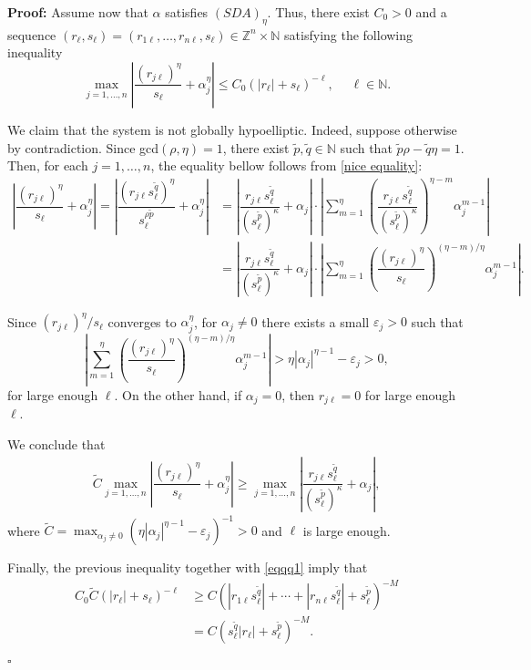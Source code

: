\documentclass[12pt]{elsarticle}
\numberwithin{equation}{section}
\newenvironment{proof}[1][\noindent \textbf{Proof: }]{#1}{ \hfill $\square$ \vspace{2mm}}
\begin{document}
\begin{proof}
	Assume now that $\alpha$ satisfies  $(SDA)_\eta$. Thus, there exist $C_0>0$ and a sequence $(r_\ell,s_\ell)=(r_{1\ell},\ldots,r_{n\ell},s_\ell)\in\mathbb{Z}^n\times\mathbb{N}$ satisfying the following inequality
	$$
	\max_{j=1,\ldots, n}	\left|\dfrac{(r_{j\ell})^ {\eta}}{s_\ell}+\alpha_j^{\eta}\right|\leq C_0 (|r_\ell|+s_\ell)^{-\ell},\quad \; \ell\in\mathbb{N}.
	$$		
	
	We claim that the system is not  globally hypoelliptic. Indeed, suppose otherwise by contradiction. 
	Since gcd$(\rho,\eta)=1$, there exist $\widetilde{p}, \widetilde{q}\in\mathbb{N}$ such that $\widetilde{p}\rho-\widetilde{q}\eta=1$. Then, for each $j=1,\ldots,n$, the equality bellow follows from  \eqref{nice equality}:
	\begin{align*}
	\left|\dfrac{(r_{j\ell})^{\eta}}{s_\ell}+\alpha_j^{\eta}\right | = \left|\dfrac{(r_{j\ell} s_{\ell}^{\widetilde{q}})^{\eta}}{s_\ell^{\rho\widetilde{p}}}+\alpha_j^{\eta}\right|  
	&= \left|\dfrac{r_{j\ell} s_{\ell}^{\widetilde{q}}}{(s_{\ell}^{\widetilde{p}})^{\kappa}}+\alpha_j\right| \cdot  \left|\sum_{m=1}^{\eta} \left(\dfrac{r_{j\ell} s_{\ell}^{\widetilde{q}}}{(s_{\ell}^{\widetilde{p}})^{\kappa}}\right)^{\eta-m}\alpha_j^{m-1}\right| \\
	& = \left|\dfrac{r_{j\ell} s_{\ell}^{\widetilde{q}}}{(s_{\ell}^{\widetilde{p}})^{\kappa}}+\alpha_j\right| \cdot  \left|\sum_{m=1}^{\eta} \left(\dfrac{(r_{j\ell})^{\eta} }{s_{\ell}}\right)^{({\eta-m})/\eta}\alpha_j^{m-1}\right|. 
	\end{align*}
	
	Since $(r_{j\ell})^{\eta}/{s_\ell}$ converges to $\alpha_j^\eta$, for $\alpha_{j}\neq 0$ there exists a small $\varepsilon_j>0$ such that 
	$$
	\left|\sum_{m=1}^{\eta} \left(\dfrac{(r_{j\ell})^{\eta} }{s_{\ell}}\right)^{({\eta-m})/\eta}\alpha_j^{m-1}\right|>\eta|\alpha_j|^{\eta-1}- \varepsilon_j >0,
	$$ 
	for large enough $\ell$. On the other hand, if $\alpha_{j}=0$, then $r_{j\ell}=0$ for large enough $\ell$.
	
	We conclude that 
	\begin{align*}
	\widetilde{C} \max_{j=1,\ldots, n}\left|\dfrac{(r_{j\ell}) ^{\eta}}{s_\ell}+\alpha_j^{\eta}\right | 
	\geq \max_{j=1,\ldots, n}\left|\dfrac{r_{j\ell} s_{\ell}^{\widetilde{q}}}{(s_{\ell}^{\widetilde{p}})^{\kappa}}+\alpha_j\right|,
	\end{align*}
	where  $\widetilde{C}=\max_{\alpha_{j}\neq 0}\left(\eta|\alpha_j|^{\eta-1}-\varepsilon_j\right)^{-1}>0$ and $\ell$ is large enough.  
	
	Finally, the previous inequality together with  \eqref{eqqq1} imply that  
	\begin{align*}
	{C_0\widetilde{C}}(|r_\ell|+s_\ell)^{-\ell}&\geq C (|r_{1\ell} s_{\ell}^{\widetilde{q}}|+\cdots+ |r_{n\ell} s_{\ell}^{\widetilde{q}}|+ s_{\ell}^{\widetilde{p}})^{-M}\\
	&= C (s_{\ell}^{\widetilde{q}}|r_\ell|+s_{\ell}^{\widetilde{p}})^{-M}.
	\end{align*}
	

\end{proof}
\end{document}
